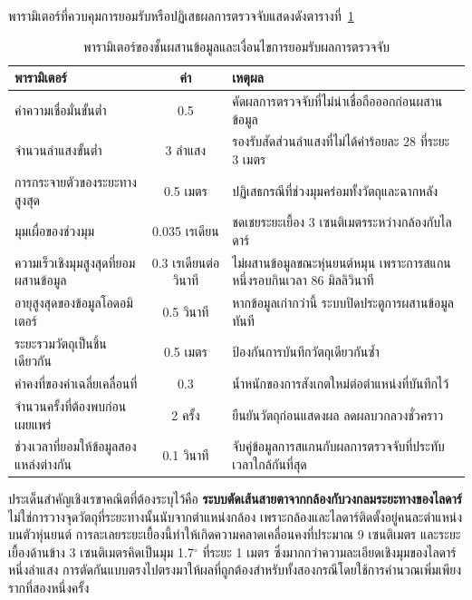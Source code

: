 \documentclass[a4paper,12pt]{report}
\begin{document}
พารามิเตอร์ที่ควบคุมการยอมรับหรือปฏิเสธผลการตรวจจับแสดงดังตารางที่~\ref{tab:fuseparam}

\begin{table}[H]
\centering
\caption[พารามิเตอร์ของชั้นผสานข้อมูลและเงื่อนไขการยอมรับผลการตรวจจับ (บทที่ 4)]{พารามิเตอร์ของชั้นผสานข้อมูลและเงื่อนไขการยอมรับผลการตรวจจับ}
\label{tab:fuseparam}
\small
\begin{tabularx}{\textwidth}{|>{\raggedright\arraybackslash}p{4.4cm}|c|X|}
\hline
\textbf{พารามิเตอร์} & \textbf{ค่า} & \textbf{เหตุผล} \\
\hline
ค่าความเชื่อมั่นขั้นต่ำ & 0.5 & คัดผลการตรวจจับที่ไม่น่าเชื่อถือออกก่อนผสานข้อมูล \\
\hline
จำนวนลำแสงขั้นต่ำ & 3 ลำแสง & รองรับสัดส่วนลำแสงที่ไม่ได้ค่าร้อยละ 28 ที่ระยะ 3 เมตร \\
\hline
การกระจายตัวของระยะทางสูงสุด & 0.5 เมตร & ปฏิเสธกรณีที่ช่วงมุมคร่อมทั้งวัตถุและฉากหลัง \\
\hline
มุมเผื่อของช่วงมุม & 0.035 เรเดียน & ชดเชยระยะเยื้อง 3 เซนติเมตรระหว่างกล้องกับไลดาร์ \\
\hline
ความเร็วเชิงมุมสูงสุดที่ยอมผสานข้อมูล & 0.3 เรเดียนต่อวินาที & ไม่ผสานข้อมูลขณะหุ่นยนต์หมุน เพราะการสแกนหนึ่งรอบกินเวลา 86 มิลลิวินาที \\
\hline
อายุสูงสุดของข้อมูลโอดอมิเตอร์ & 0.5 วินาที & หากข้อมูลเก่ากว่านี้ ระบบปิดประตูการผสานข้อมูลทันที \\
\hline
ระยะรวมวัตถุเป็นชิ้นเดียวกัน & 0.5 เมตร & ป้องกันการบันทึกวัตถุเดียวกันซ้ำ \\
\hline
ค่าคงที่ของค่าเฉลี่ยเคลื่อนที่ & 0.3 & น้ำหนักของการสังเกตใหม่ต่อตำแหน่งที่บันทึกไว้ \\
\hline
จำนวนครั้งที่ต้องพบก่อนเผยแพร่ & 2 ครั้ง & ยืนยันวัตถุก่อนแสดงผล ลดผลบวกลวงชั่วคราว \\
\hline
ช่วงเวลาที่ยอมให้ข้อมูลสองแหล่งต่างกัน & 0.1 วินาที & จับคู่ข้อมูลการสแกนกับผลการตรวจจับที่ประทับเวลาใกล้กันที่สุด \\
\hline
\end{tabularx}
\end{table}

ประเด็นสำคัญเชิงเรขาคณิตที่ต้องระบุไว้คือ
\textbf{ระบบตัดเส้นสายตาจากกล้องกับวงกลมระยะทางของไลดาร์}
ไม่ใช่การวางจุดวัตถุที่ระยะทางนั้นนับจากตำแหน่งกล้อง
เพราะกล้องและไลดาร์ติดตั้งอยู่คนละตำแหน่งบนตัวหุ่นยนต์
การละเลยระยะเยื้องนี้ทำให้เกิดความคลาดเคลื่อนคงที่ประมาณ 9 เซนติเมตร
และระยะเยื้องด้านข้าง 3 เซนติเมตรคิดเป็นมุม 1.7$^\circ$ ที่ระยะ 1 เมตร
ซึ่งมากกว่าความละเอียดเชิงมุมของไลดาร์หนึ่งลำแสง
การตัดกันแบบตรงไปตรงมาให้ผลที่ถูกต้องสำหรับทั้งสองกรณีโดยใช้การคำนวณเพิ่มเพียงรากที่สองหนึ่งครั้ง
\end{document}
